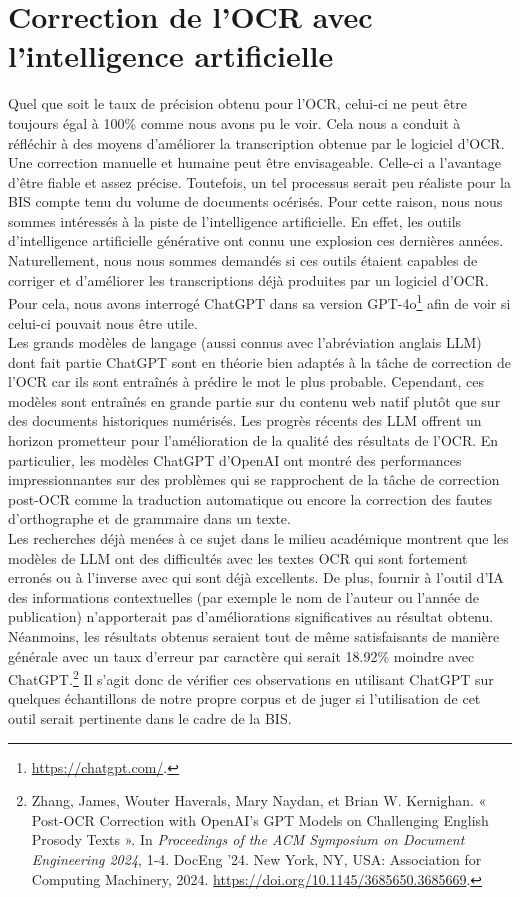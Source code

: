 \documentclass[a4paper,12pt,twoside]{book}
\begin{document}
\section{Correction de l'OCR avec l'intelligence artificielle}

Quel que soit le taux de précision obtenu pour l'OCR, celui-ci ne peut
être toujours égal à 100\% comme nous avons pu le voir. Cela nous a
conduit à réfléchir à des moyens d'améliorer la transcription obtenue
par le logiciel d'OCR. Une correction manuelle et humaine peut être envisageable. Celle-ci a l’avantage d’être fiable et assez précise. Toutefois, un tel processus serait peu réaliste pour la BIS compte tenu du volume de documents océrisés. Pour cette raison, nous nous sommes intéressés à la piste
de l'intelligence artificielle. En effet, les outils
d'intelligence artificielle générative ont connu une explosion ces
dernières années. Naturellement, nous nous sommes demandés si ces outils
étaient capables de corriger et d'améliorer les
transcriptions déjà produites par un logiciel d'OCR. Pour cela, nous
avons interrogé ChatGPT dans sa version GPT-4o\footnote{\url{https://chatgpt.com/}.}
afin de voir si celui-ci pouvait nous être utile. \\

Les grands modèles de langage (aussi connus avec l’abréviation anglais LLM) dont fait partie ChatGPT sont en théorie bien adaptés à la tâche de correction de l’OCR car ils sont entraînés à prédire le mot le plus probable. Cependant, ces modèles sont entraînés en grande partie sur du contenu web natif plutôt que sur des documents historiques numérisés. Les progrès récents des LLM offrent un horizon prometteur pour l'amélioration de la qualité des résultats de l'OCR. En particulier, les modèles ChatGPT d'OpenAI ont montré des performances impressionnantes sur des problèmes qui se rapprochent de la tâche de correction post-OCR comme la traduction automatique ou encore la correction des fautes d'orthographe et de grammaire dans un texte. \\

Les recherches déjà menées à ce sujet dans le milieu académique montrent que les modèles de LLM ont des difficultés avec les textes OCR qui sont fortement erronés ou à l’inverse avec qui sont déjà excellents. De plus, fournir à l’outil d’IA des informations contextuelles (par exemple le nom de l'auteur ou l'année de publication) n'apporterait pas d'améliorations significatives au résultat obtenu. Néanmoins, les résultats obtenus seraient tout de même satisfaisants de manière générale avec un taux d’erreur par caractère qui serait 18.92\% moindre avec ChatGPT.\footnote{Zhang, James, Wouter Haverals, Mary Naydan, et Brian W. Kernighan. « Post-OCR Correction with OpenAI’s GPT Models on Challenging English Prosody Texts ». In \emph{Proceedings of the ACM Symposium on Document Engineering 2024}, 1‑4. DocEng ’24. New York, NY, USA: Association for Computing Machinery, 2024. 
	\url{https://doi.org/10.1145/3685650.3685669}.} Il s’agit donc de vérifier ces observations en utilisant ChatGPT sur quelques échantillons de notre propre corpus et de juger si l’utilisation de cet outil serait pertinente dans le cadre de la BIS. \\
\end{document}
